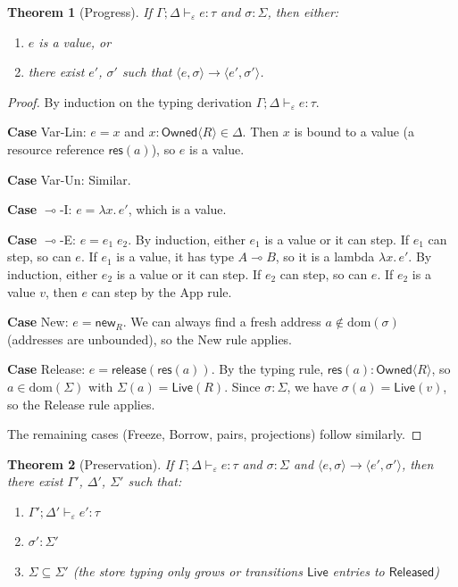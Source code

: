 \documentclass[11pt]{article}
\newtheorem{theorem}{Theorem}[section]
\newcommand{\Owned}[1]{\mathsf{Owned}\langle #1 \rangle}
\newcommand{\lolli}{\multimap}
\begin{document}
\begin{theorem}[Progress]\label{thm:progress}
If $\Gamma; \Delta \vdash_\varepsilon e : \tau$ and $\sigma : \Sigma$,
then either:
\begin{enumerate}[label=(\alph*)]
  \item $e$ is a value, or
  \item there exist $e'$, $\sigma'$ such that
        $\langle e, \sigma \rangle \longrightarrow
        \langle e', \sigma' \rangle$.
\end{enumerate}
\end{theorem}

\begin{proof}
By induction on the typing derivation $\Gamma; \Delta \vdash_\varepsilon
e : \tau$.

\textbf{Case} Var-Lin: $e = x$ and $x : \Owned{R} \in \Delta$.
Then $x$ is bound to a value (a resource reference $\mathsf{res}(a)$),
so $e$ is a value.

\textbf{Case} Var-Un: Similar.

\textbf{Case} $\lolli$-I: $e = \lambda x.\, e'$, which is a value.

\textbf{Case} $\lolli$-E: $e = e_1\; e_2$.  By induction, either
$e_1$ is a value or it can step.  If $e_1$ can step, so can $e$.
If $e_1$ is a value, it has type $A \lolli B$, so it is a lambda
$\lambda x.\, e'$.  By induction, either $e_2$ is a value or it can
step.  If $e_2$ can step, so can $e$.  If $e_2$ is a value $v$, then
$e$ can step by the App rule.

\textbf{Case} New: $e = \mathsf{new}_R$.  We can always find a fresh
address $a \notin \mathrm{dom}(\sigma)$ (addresses are unbounded), so
the New rule applies.

\textbf{Case} Release: $e = \mathsf{release}(\mathsf{res}(a))$.  By
the typing rule, $\mathsf{res}(a) : \Owned{R}$, so $a \in
\mathrm{dom}(\Sigma)$ with $\Sigma(a) = \mathsf{Live}(R)$.  Since
$\sigma : \Sigma$, we have $\sigma(a) = \mathsf{Live}(v)$, so the
Release rule applies.

The remaining cases (Freeze, Borrow, pairs, projections) follow
similarly.
\end{proof}

\begin{theorem}[Preservation]\label{thm:preservation}
If $\Gamma; \Delta \vdash_\varepsilon e : \tau$ and $\sigma : \Sigma$
and $\langle e, \sigma \rangle \longrightarrow \langle e', \sigma'
\rangle$, then there exist $\Gamma'$, $\Delta'$, $\Sigma'$ such that:
\begin{enumerate}[label=(\alph*)]
  \item $\Gamma'; \Delta' \vdash_\varepsilon e' : \tau$
  \item $\sigma' : \Sigma'$
  \item $\Sigma \subseteq \Sigma'$ (the store typing only grows or
        transitions $\mathsf{Live}$ entries to $\mathsf{Released}$)
\end{enumerate}
\end{theorem}
\end{document}
